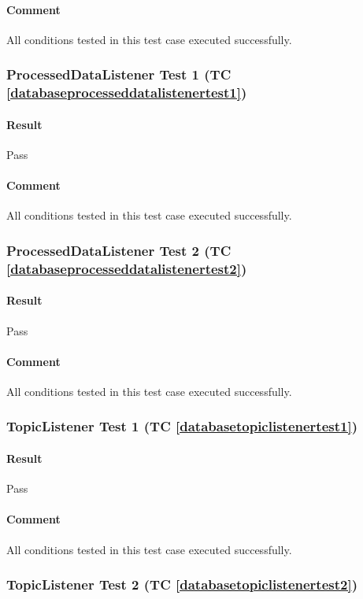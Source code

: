 \documentclass[hidelinks,english]{article}
\begin{document}
				\paragraph{Comment} All conditions tested in this test case executed successfully.
			
			\subsubsection{ProcessedDataListener Test 1 (TC \ref{databaseprocesseddatalistenertest1})}
				\paragraph{Result} Pass
				\paragraph{Comment} All conditions tested in this test case executed successfully.
			
			\subsubsection{ProcessedDataListener Test 2 (TC \ref{databaseprocesseddatalistenertest2})}
				\paragraph{Result} Pass
				\paragraph{Comment} All conditions tested in this test case executed successfully.
			
			\subsubsection{TopicListener Test 1 (TC \ref{databasetopiclistenertest1})}
				\paragraph{Result} Pass
				\paragraph{Comment} All conditions tested in this test case executed successfully.
			
			\subsubsection{TopicListener Test 2 (TC \ref{databasetopiclistenertest2})}
\end{document}
